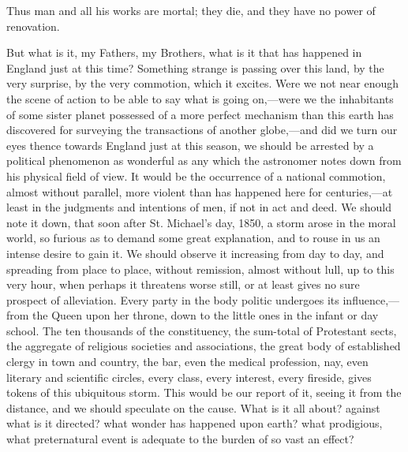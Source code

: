Thus man and all his works are mortal; they die, and
they have no power of renovation.

But what is it, my Fathers, my Brothers, what is it
that has happened in England just at this time? Something
strange is passing over this land, by the very surprise,
by the very commotion, which it excites. Were we not near
enough the scene of action to be able to say what is
going on,—were we the inhabitants of some sister
planet possessed of a more perfect mechanism than this
earth has discovered for surveying the transactions of
another globe,—and did we turn our eyes thence
towards England just at this season, we should be
arrested by a political phenomenon as wonderful as any
which the astronomer notes down from his physical field
of view. It would be the occurrence of a national
commotion, almost without parallel, more violent than has
happened here for centuries,—at least in the
judgments and intentions of men, if not in act and deed.
We should note it down, that soon after St. Michael's
day, 1850, a storm arose in the moral world, so furious
as to demand some great explanation, and to rouse in us
an intense desire to gain it. We should observe it
increasing from day to day, and spreading from place to
place, without remission, almost without lull, up to this
very hour, when perhaps it threatens worse still, or at
least gives no sure prospect of alleviation. Every party
in the body politic undergoes its influence,—from
the Queen upon her throne, down to the little ones in the
infant or day school. The ten thousands of the
constituency, the sum-total of Protestant sects, the
aggregate of religious societies and associations, the
great body of established clergy in town and country, the
bar, even the medical profession, nay, even literary and
scientific circles, every class, every interest, every
fireside, gives tokens of this ubiquitous storm. This
would be our report of it, seeing it from the distance,
and we should speculate on the cause. What is it all
about? against what is it directed? what wonder has
happened upon earth? what prodigious, what preternatural
event is adequate to the burden of so vast an effect?

